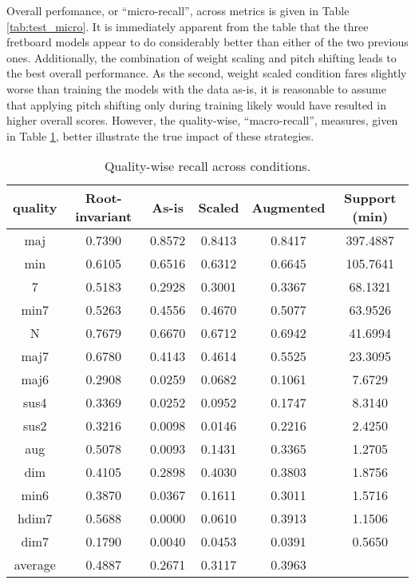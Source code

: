 Overall perfomance, or ``micro-recall'', across metrics is given in Table \ref{tab:test_micro}.
It is immediately apparent from the table that the three fretboard models appear to do considerably better than either of the two previous ones.
Additionally, the combination of weight scaling and pitch shifting leads to the best overall performance.
As the second, weight scaled condition fares slightly worse than training the models with the data as-is, it is reasonable to assume that applying pitch shifting only during training likely would have resulted in higher overall scores.
However, the quality-wise, ``macro-recall'', measures, given in Table \ref{tab:test_qualitywise}, better illustrate the true impact of these strategies.

\begin{table}[t]
\begin{center}
\scriptsize
\caption{Quality-wise recall across conditions.}
\label{tab:test_qualitywise}
\begin{tabular}{c|c|ccc|c}

 quality   &  Root-invariant &  As-is & Scaled & Augmented & Support (min) \\
\hline
 maj       &  0.7390 &  0.8572 &  0.8413 &  0.8417 &  397.4887 \\
 min       &  0.6105 &  0.6516 &  0.6312 &  0.6645 &  105.7641 \\
 7         &  0.5183 &  0.2928 &  0.3001 &  0.3367 &   68.1321 \\
 min7      &  0.5263 &  0.4556 &  0.4670 &  0.5077 &   63.9526 \\
 N         &  0.7679 &  0.6670 &  0.6712 &  0.6942 &   41.6994 \\
 maj7      &  0.6780 &  0.4143 &  0.4614 &  0.5525 &   23.3095 \\
 \hline
 maj6      &  0.2908 &  0.0259 &  0.0682 &  0.1061 &    7.6729 \\
 sus4      &  0.3369 &  0.0252 &  0.0952 &  0.1747 &    8.3140 \\
 sus2      &  0.3216 &  0.0098 &  0.0146 &  0.2216 &    2.4250 \\
 aug       &  0.5078 &  0.0093 &  0.1431 &  0.3365 &    1.2705 \\
 dim       &  0.4105 &  0.2898 &  0.4030 &  0.3803 &    1.8756 \\
 min6      &  0.3870 &  0.0367 &  0.1611 &  0.3011 &    1.5716 \\
 hdim7     &  0.5688 &  0.0000 &  0.0610 &  0.3913 &    1.1506 \\
 dim7      &  0.1790 &  0.0040 &  0.0453 &  0.0391 &    0.5650 \\
 \hline
 average   &  0.4887 &  0.2671 &  0.3117 &  0.3963 &  \\
\hline
\end{tabular}
\end{center}
\end{table}

